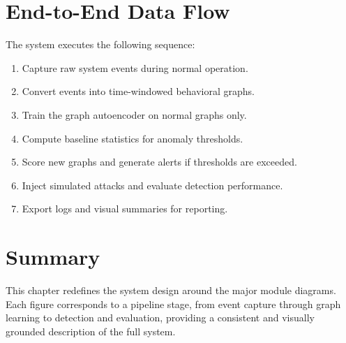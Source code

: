 \section{End-to-End Data Flow}
The system executes the following sequence:
\begin{enumerate}
	\item Capture raw system events during normal operation.
	\item Convert events into time-windowed behavioral graphs.
	\item Train the graph autoencoder on normal graphs only.
	\item Compute baseline statistics for anomaly thresholds.
	\item Score new graphs and generate alerts if thresholds are exceeded.
	\item Inject simulated attacks and evaluate detection performance.
	\item Export logs and visual summaries for reporting.
\end{enumerate}

\section{Summary}
This chapter redefines the system design around the major module diagrams. Each
figure corresponds to a pipeline stage, from event capture through graph learning
to detection and evaluation, providing a consistent and visually grounded
description of the full system.
